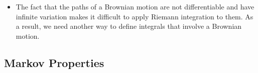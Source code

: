 \documentclass[10pt]{article}
\newcommand{\mcal}[1]{\mathcal{#1}}
\begin{document}
\begin{itemize}
  \item The fact that the paths of a Brownian motion are not differentiable and have infinite variation makes it difficult to apply Riemann integration to them. As a result, we need another way to define integrals that involve a Brownian motion.

\begin{comment}
  \item Note that the fact that $V^{(1)}_{[a,b]}(W)$ is infinite follows from the fact that $V^{(2)}_{[a,b]}(W)$ is finite. To see this, note that $W(t)$ is locally $\alpha$-H\"{o}lder. So, for $n$ large enough, we would have that, for any $0 < \alpha < 1/2$.
  \begin{align*}
    |W(t^{(n)}_j) - W(t^{(n)}_{j-1})| &\leq c| t^{(n)}_j - t^{(n)}_{j-1} |^\alpha \leq c| \mcal{P}^{(n)} |^\alpha \\
    \frac{1}{|W(t^{(n)}_j) - W(t^{(n)}_{j-1})|}  & \geq \frac{1}{c|\mcal{P}^{(n)}|^\alpha} \\
    \frac{(W(t^{(n)}_j) - W(t^{(n)}_{j-1}))^2}{|W(t^{(n)}_j) - W(t^{(n)}_{j-1})|}  & \geq \frac{1}{c|\mcal{P}^{(n)}|^\alpha} (W(t^{(n)}_j) - W(t^{(n)}_{j-1}))^2 \\
    |W(t^{(n)}_j) - W(t^{(n)}_{j-1})| &\geq \frac{1}{c|\mcal{P}^{(n)}|^\alpha} (W(t^{(n)}_j) - W(t^{(n)}_{j-1}))^2 \\
    \sum_{j=1}^{k(n)} |W(t^{(n)}_j) - W(t^{(n)}_{j-1})| &\geq \frac{1}{c|\mcal{P}^{(n)}|^\alpha} \sum_{j=1}^{k(n)} (W(t^{(n)}_j) - W(t^{(n)}_{j-1}))^2.
  \end{align*} 
  Taking the limit on both sides, we have that
  \begin{align*}
    V^{(1)}_{[a,b]}(W) \geq V^{(2)}_{[a,b]}(W) \bigg( \lim_{|\mcal{P}^{(n)}| \rightarrow 0} \frac{1}{c|\mcal{P}^{(n)}|^\alpha} \bigg).
  \end{align*}
  So, if $V^{(2)}_{[a,b]}(W)$ is a positive, then $V^{(1)}_{[a,b]}(W)$ would have to be infinite.
\end{comment}

\end{itemize}

\subsection{Markov Properties}
\end{document}
